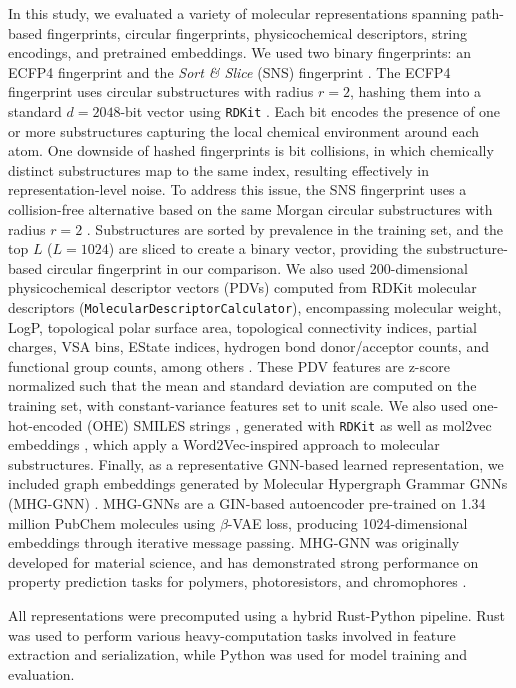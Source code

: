 \documentclass[pdflatex,sn-basic]{sn-jnl}%
\theoremstyle{thmstyleone}%
\theoremstyle{thmstyletwo}%
\theoremstyle{thmstylethree}%
\begin{document}
In this study, we evaluated a variety of molecular representations spanning path-based fingerprints, circular fingerprints, physicochemical descriptors, string encodings, and pretrained embeddings. We used two binary fingerprints: an ECFP4 fingerprint and the \emph{Sort \& Slice} (SNS) fingerprint \citep{sns}. The ECFP4 fingerprint uses circular substructures with radius $r=2$, hashing them into a standard $d=2048$-bit vector using \texttt{RDKit} \citep{rdkit}. Each bit encodes the presence of one or more substructures capturing the local chemical environment around each atom. One downside of hashed fingerprints is bit collisions, in which chemically distinct substructures map to the same index, resulting effectively in representation-level noise. To address this issue, the SNS fingerprint uses a collision-free alternative based on the same Morgan circular substructures with radius $r=2$ \citep{sns}. Substructures are sorted by prevalence in the training set, and the top $L$ ($L=1024$) are sliced to create a binary vector, providing the substructure-based circular fingerprint in our comparison. We also used 200-dimensional physicochemical descriptor vectors (PDVs) computed from RDKit molecular descriptors (\texttt{MolecularDescriptorCalculator}), encompassing molecular weight, LogP, topological polar surface area, topological connectivity indices, partial charges, VSA bins, EState indices, hydrogen bond donor/acceptor counts, and functional group counts, among others \citep{Cherkasov2014}. These PDV features are z-score normalized such that the mean and standard deviation are computed on the training set, with constant-variance features set to unit scale. We also used one-hot-encoded (OHE) SMILES strings \citep{Bertoni2020}, generated with \texttt{RDKit} \citep{rdkit} as well as mol2vec embeddings \citep{jaeger2018mol2vec}, which apply a Word2Vec-inspired approach to molecular substructures. Finally, as a representative GNN-based learned representation, we included graph embeddings generated by Molecular Hypergraph Grammar GNNs (MHG-GNN) \citep{kishimoto2023}. MHG-GNNs are a GIN-based autoencoder pre-trained on 1.34 million PubChem molecules using $\beta$-VAE loss, producing 1024-dimensional embeddings through iterative message passing. MHG-GNN was originally developed for material science, and has demonstrated strong performance on property prediction tasks for polymers, photoresistors, and chromophores \citep{kishimoto2023}. 

All representations were precomputed using a hybrid Rust-Python pipeline. Rust was used to perform various heavy-computation tasks involved in feature extraction and serialization, while Python was used for model training and evaluation. 
\end{document}

